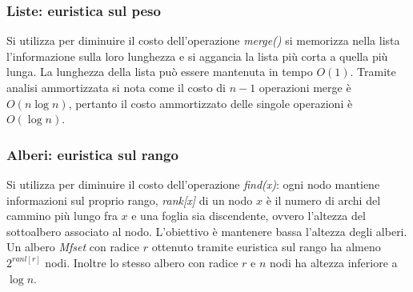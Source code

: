 \subsubsection{Liste: euristica sul peso}
Si utilizza per diminuire il costo dell'operazione \emph{merge()} si memorizza nella lista l'informazione sulla loro lunghezza e si aggancia la lista pi\`u corta a quella pi\`u lunga. La lunghezza della lista pu\`o 
essere mantenuta in tempo $O(1)$. Tramite analisi ammortizzata si nota come il costo di $n-1$ operazioni merge \`e $O(n\log n)$, pertanto il costo ammortizzato delle singole operazioni \`e $O(\log n)$.
\subsubsection{Alberi: euristica sul rango}
Si utilizza per diminuire il costo dell'operazione \emph{find(x)}: ogni nodo mantiene informazioni sul proprio rango, \emph{rank[x]} di un nodo $x$ \`e il numero di archi del cammino pi\`u lungo fra $x$ e una 
foglia sia discendente, ovvero l'altezza del sottoalbero associato al nodo. L'obiettivo \`e mantenere bassa l'altezza degli alberi. Un albero \emph{Mfset} con radice $r$ ottenuto tramite euristica sul
rango ha almeno $2^{ranl[r]}$ nodi. Inoltre lo stesso albero con radice $r$ e $n$ nodi ha altezza inferiore a $\log n$. 
